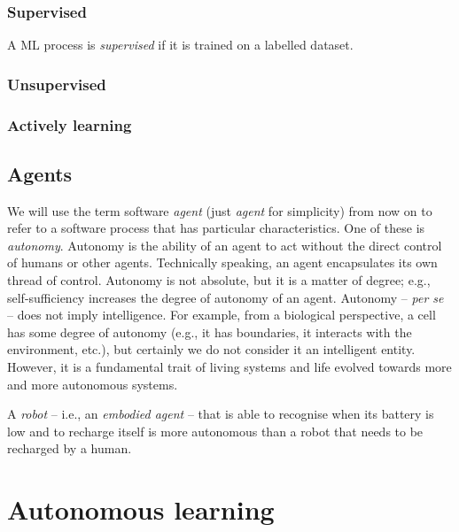 \subsubsection{Supervised}\label{subsubsec:supervised}
%
A \gls{ML} process is \emph{supervised} if it is trained on a labelled dataset.

\subsubsection{Unsupervised}\label{subsubsec:unsupervised}

\subsubsection{}\label{subsubsec:rl}

\subsubsection{Actively learning}\label{subsubsec:actively-learning}

\subsection{Agents}\label{subsec:agents}
%
We will use the term software \emph{agent} (just \emph{agent} for simplicity) from now on to refer to a software process that has particular characteristics.
%
One of these is \emph{autonomy}.
%
Autonomy is the ability of an agent to act without the direct control of humans or other agents.
%
Technically speaking, an agent encapsulates its own thread of control.
%
Autonomy is not absolute, but it is a matter of degree; e.g., self-sufficiency increases the degree of autonomy of an agent.
%
Autonomy -- \emph{per se} -- does not imply intelligence.
%
For example, from a biological perspective, a cell has some degree of autonomy (e.g., it has boundaries, it interacts with the environment, etc.), but certainly we do not consider it an intelligent entity.
%
However, it is a fundamental trait of living systems and life evolved towards more and more autonomous systems.


A \emph{robot} -- i.e., an \emph{embodied agent} -- that is able to recognise when its battery is low and to recharge itself is more autonomous than a robot that needs to be recharged by a human.


\section{Autonomous learning}\label{sec:autonomous-learning}

